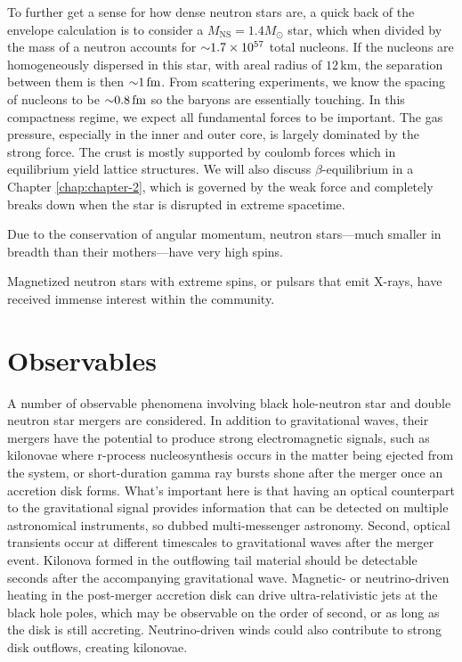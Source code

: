 To further get a sense for how dense neutron stars are, a quick back of the envelope calculation is to consider a $M_\textrm{NS} = 1.4 M _\odot$ star, which when divided by the mass of a neutron accounts for $\mathord{\sim} 1.7 \times 10^{57}$ total nucleons.
If the nucleons are homogeneously dispersed in this star, with areal radius of $12\,\textrm{km}$, the separation between them is then $\mathord{\sim} 1\,\textrm{fm}$.
From scattering experiments, we know the spacing of nucleons to be $\mathord{\sim} 0.8\,\textrm{fm}$ so the baryons are essentially touching.
In this compactness regime, we expect all fundamental forces to be important.
The gas pressure, especially in the inner and outer core, is largely dominated by the strong force.  
The crust is mostly supported by coulomb forces which in equilibrium yield lattice structures.
We will also discuss $\beta$-equilibrium in a Chapter \ref{chap:chapter-2}, which is governed by the weak force and completely breaks down when the star is disrupted in extreme spacetime.



Due to the conservation of angular momentum, neutron stars---much smaller in breadth than their mothers---have very high spins.

Magnetized neutron stars with extreme spins, or pulsars that emit X-rays,
 have received immense interest within the community.




\section{Observables}
\label{sec:observables}

A number of observable phenomena involving black hole-neutron star and double neutron star mergers are considered.  
In addition to gravitational waves, their mergers have the potential to produce strong electromagnetic signals, such as kilonovae where r-process nucleosynthesis occurs in the matter being ejected from the system, or short-duration gamma ray bursts shone after the merger once an accretion disk forms.
What's important here is that having an optical counterpart to the gravitational signal provides information that can be detected on multiple astronomical instruments, so dubbed multi-messenger astronomy.
Second, optical transients occur at different timescales to gravitational waves after the merger event.
Kilonova formed in the outflowing tail material should be detectable seconds after the accompanying gravitational wave.  
Magnetic- or neutrino-driven heating in the post-merger accretion disk can drive ultra-relativistic jets at the black hole poles, which may be observable on the order of second, or as long as the disk is still accreting.
Neutrino-driven winds could also contribute to strong disk outflows, creating  kilonovae.

